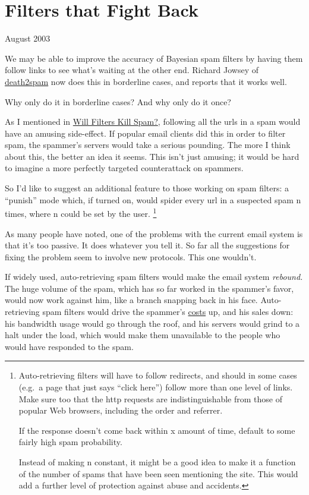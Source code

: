\chapter{Filters that Fight Back}

August 2003

We may be able to improve the accuracy of Bayesian spam filters by
having them follow links to see what's waiting at the other end. Richard
Jowsey of \href{http://death2spam.com}{death2spam} now does this in
borderline cases, and reports that it works well.

Why only do it in borderline cases? And why only do it once?

As I mentioned in \href{wfks.html}{Will Filters Kill Spam?}, following
all the urls in a spam would have an amusing side-effect. If popular
email clients did this in order to filter spam, the spammer's servers
would take a serious pounding. The more I think about this, the better
an idea it seems. This isn't just amusing; it would be hard to imagine a
more perfectly targeted counterattack on spammers.

So I'd like to suggest an additional feature to those working on spam
filters: a ``punish'' mode which, if turned on, would spider every url
in a suspected spam n times, where n could be set by the user. \footnote{Auto-retrieving filters will have to follow redirects, and
should in some cases (e.g.~a page that just says ``click here'') follow
more than one level of links. Make sure too that the http requests are
indistinguishable from those of popular Web browsers, including the
order and referrer.

If the response doesn't come back within x amount of time, default to
some fairly high spam probability.

Instead of making n constant, it might be a good idea to make it a
function of the number of spams that have been seen mentioning the site.
This would add a further level of protection against abuse and
accidents.}

As many people have noted, one of the problems with the current email
system is that it's too passive. It does whatever you tell it. So far
all the suggestions for fixing the problem seem to involve new
protocols. This one wouldn't.

If widely used, auto-retrieving spam filters would make the email system
\emph{rebound.} The huge volume of the spam, which has so far worked in
the spammer's favor, would now work against him, like a branch snapping
back in his face. Auto-retrieving spam filters would drive the spammer's
\href{http://www.bork.ca/pics/?path=incoming&img=bill.jpg}{costs} up,
and his sales down: his bandwidth usage would go through the roof, and
his servers would grind to a halt under the load, which would make them
unavailable to the people who would have responded to the spam.

